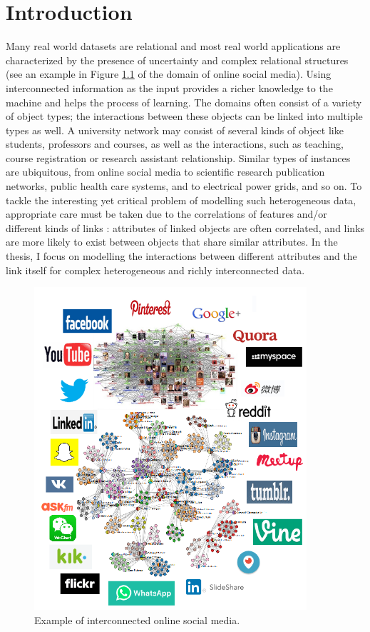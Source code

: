 \documentclass{sfuthesis}
\begin{document}
\mainmatter%

\chapter{Introduction }\label{sec:intro}

Many real world datasets are relational and most real world applications are characterized by the presence of uncertainty and complex relational structures (see an example in Figure \ref{fig:RelationalSocialMedia1} of the domain of online social media). Using interconnected information as the input provides a richer knowledge to the machine and helps the process of learning. The domains often consist of a variety of object types; the interactions between these objects can be linked  into multiple types as well. A university network may consist of several kinds of object like students, professors and courses, as well as the interactions, such as teaching, course registration or research assistant relationship. Similar types of instances are ubiquitous, from online social media to scientific research publication networks,  public health care systems, and to electrical power grids, and so on. To tackle the interesting yet critical problem of modelling such heterogeneous data, appropriate care must be taken due to the correlations of features and/or different kinds of links \cite{Sun2012}: attributes of linked objects are often correlated, and links are more likely to exist between objects that share similar attributes. In the thesis, I focus on  modelling the interactions between different attributes and the link itself for complex heterogeneous and richly interconnected data.

\begin{figure}[!h] 
   \centering
      \includegraphics[width=0.9\textwidth]{socialGraph.png} 
   \caption{Example of interconnected online social media. %
}
   \label{fig:RelationalSocialMedia1}
\end{figure}
\end{document}
